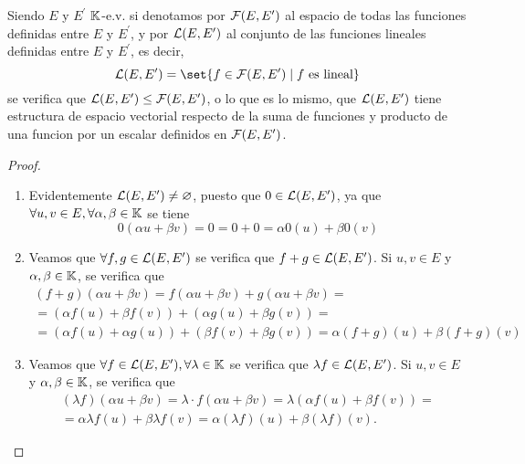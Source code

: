 \begin{proposition}
	Siendo \(E \) y \(E^\prime \) \(\mathbb{K} \)-e.v. si denotamos por \(\mathcal{\MakeUppercase{f}}(E,E^\prime  )\) al espacio de todas las funciones definidas entre \(E \) y \(E^\prime  \), y por \(\mathcal{\MakeUppercase{l}}(E,E^\prime )\) al conjunto de las funciones lineales definidas entre \(E \) y \(E^\prime  \), es decir,
	\[
		\mathcal{\MakeUppercase{l}}(E,E^\prime ) = \set{f \in \mathcal{\MakeUppercase{f}}(E,E^\prime ) \mid f \text{ es lineal} }
	\]
	se verifica que \(\mathcal{\MakeUppercase{l}}(E,E^\prime ) \leq \mathcal{\MakeUppercase{f}}(E,E^\prime )\), o lo que es lo mismo, que \(\mathcal{\MakeUppercase{l}}(E,E^\prime )\) tiene estructura de espacio vectorial respecto de la suma de funciones y producto de una funcion por un escalar definidos en \(\mathcal{\MakeUppercase{f}}(E,E^\prime )\).
\end{proposition}
\begin{proof}
	\begin{enumerate}
		\item Evidentemente \(\mathcal{\MakeUppercase{l}}(E,
		      E^\prime ) \neq \varnothing\), puesto que \(0 \in \mathcal{\MakeUppercase{l}}(E,E^\prime )\), ya que \(\forall u,v \in E, \forall \alpha,\beta \in \mathbb{K} \) se tiene
		      \[
			      0(\alpha u + \beta v) = 0 = 0 + 0 = \alpha 0 (u) + \beta 0 (v )
		      \]
		\item Veamos que \(\forall  f,g \in \mathcal{\MakeUppercase{l}}(E,E^\prime)\) se verifica que \(f + g \in \mathcal{\MakeUppercase{l}}(E,E^\prime )\). Si \(u,v \in E \) y \(\alpha,\beta \in \mathbb{K} \), se verifica que
		      \begin{multline*}
			      (f+g)(\alpha u + \beta v) = f(\alpha u + \beta v) + g(\alpha u + \beta v) = \\ = (\alpha f(u) + \beta f(v)) + (\alpha g (u) + \beta g(v)) = \\ = (\alpha f(u) + \alpha g(u)) + (\beta f(v) + \beta g(v)) = \alpha(f +g)(u) + \beta(f+g)(v )
		      \end{multline*}
		\item Veamos que \(\forall f \in \mathcal{\MakeUppercase{l}}(E,E^\prime ), \forall \lambda \in \K \) se verifica que \(\lambda f \in \mathcal{\MakeUppercase{l}}(E,E^\prime )\). Si \(u,v \in E \) y \(\alpha,\beta \in \mathbb{K} \), se verifica que
		      \begin{multline*}
			      (\lambda f)(\alpha u + \beta v) = \lambda \cdot f (\alpha u + \beta v ) = \lambda (\alpha f(u) + \beta f(v)) = \\
			      = \alpha \lambda f(u) + \beta \lambda f(v) = \alpha (\lambda f)(u) + \beta (\lambda f) (v).
		      \end{multline*}
	\end{enumerate}
\end{proof}

